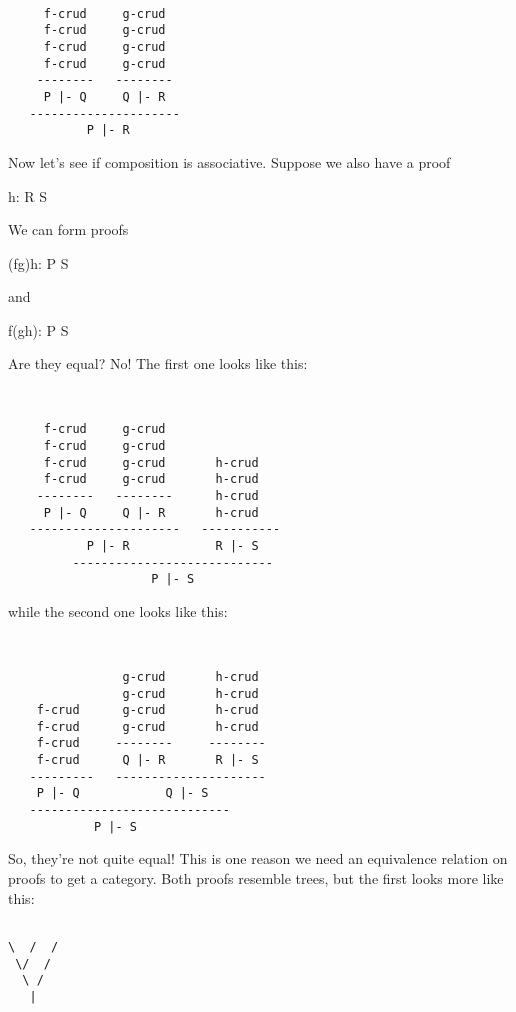 \begin{verbatim}

     f-crud     g-crud
     f-crud     g-crud
     f-crud     g-crud
     f-crud     g-crud
    --------   --------
     P |- Q     Q |- R
   ---------------------
           P |- R 
\end{verbatim}
    
Now let's see if composition is associative.  Suppose we also have a 
proof

h: R \to  S

We can form proofs

(fg)h: P \to  S

and

f(gh): P \to  S 

Are they equal?  No!  The first one looks like this:



\begin{verbatim}


     f-crud     g-crud
     f-crud     g-crud
     f-crud     g-crud       h-crud
     f-crud     g-crud       h-crud
    --------   --------      h-crud
     P |- Q     Q |- R       h-crud
   ---------------------   ----------- 
           P |- R            R |- S 
         ----------------------------
                    P |- S

\end{verbatim}
    
while the second one looks like this:



\begin{verbatim}


                g-crud       h-crud
                g-crud       h-crud
    f-crud      g-crud       h-crud
    f-crud      g-crud       h-crud
    f-crud     --------     --------      
    f-crud      Q |- R       R |- S      
   ---------   --------------------- 
    P |- Q            Q |- S 
   ----------------------------
            P |- S

\end{verbatim}
    
So, they're not quite equal!  This is one reason we need an 
equivalence relation on proofs to get a category.  Both proofs 
resemble trees, but the first looks more like this:


\begin{verbatim}

\  /  /
 \/  /
  \ /
   |
\end{verbatim}
    
